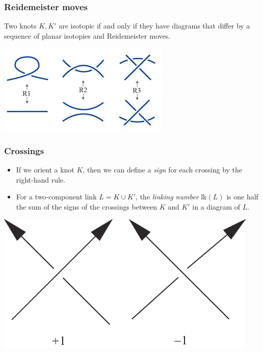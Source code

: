 \documentclass{beamer}
\newcommand{\lk}{\text{lk}}
\theoremstyle{ex}
\theoremstyle{rem}
\begin{document}
	\begin{frame}
		\frametitle{Reidemeister moves}
		
		\begin{theorem}[Reidemeister]
			Two knots $K,K'$ are isotopic if and only if they have diagrams that differ by a sequence of planar isotopies and Reidemeister moves.
		\end{theorem}
		
		\begin{center}
			\includegraphics[scale=0.7]{reidemeister.jpg}
		\end{center}
	\end{frame}

	\begin{frame}
		\frametitle{Crossings}
		\begin{itemize}
			\item If we orient a knot $K$, then we can define a \textit{sign} for each crossing by the right-hand rule.
			
			\item For a two-component link $L=K\cup K'$, the \textit{linking number} $\lk(L)$ is one half the sum of the signs of the crossings between $K$ and $K'$ in a diagram of $L$.
		\end{itemize}
	
		\begin{center}
			\includegraphics[scale=0.25]{signs}
		\end{center}
	\end{frame}
\end{document}
